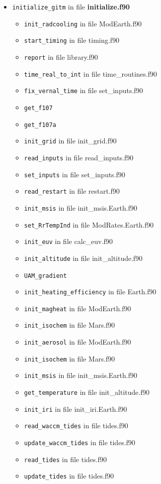 \begin{itemize}
\item {\tt initialize\_gitm}   in file {\bf initialize.f90}
  \begin{itemize}
    \item {\tt init\_radcooling} in file ModEarth.f90
    \item {\tt start\_timing} in file timing.f90
    \item {\tt report} in file library.f90
    \item {\tt time\_real\_to\_int} in file time\_routines.f90
    \item {\tt fix\_vernal\_time} in file set\_inputs.f90
    \item {\tt get\_f107}
    \item {\tt get\_f107a}
    \item {\tt init\_grid} in file init\_grid.f90
    \item {\tt read\_inputs} in file read\_inputs.f90
    \item {\tt set\_inputs} in file set\_inputs.f90
    \item {\tt read\_restart} in file restart.f90
    \item {\tt init\_msis} in file init\_msis.Earth.f90
    \item {\tt set\_RrTempInd} in file ModRates.Earth.f90
    \item {\tt init\_euv} in file calc\_euv.f90
    \item {\tt init\_altitude} in file init\_altitude.f90
    \item {\tt UAM\_gradient}
    \item {\tt init\_heating\_efficiency} in file Earth.f90
    \item {\tt init\_magheat} in file ModEarth.f90
    \item {\tt init\_isochem} in file Mars.f90
    \item {\tt init\_aerosol} in file ModEarth.f90
    \item {\tt init\_isochem} in file Mars.f90
    \item {\tt init\_msis} in file init\_msis.Earth.f90
    \item {\tt get\_temperature} in file init\_altitude.f90
    \item {\tt init\_iri} in file init\_iri.Earth.f90
    \item {\tt read\_waccm\_tides} in file tides.f90
    \item {\tt update\_waccm\_tides} in file tides.f90
    \item {\tt read\_tides} in file tides.f90
    \item {\tt update\_tides} in file tides.f90

\end{itemize}
\end{itemize}
